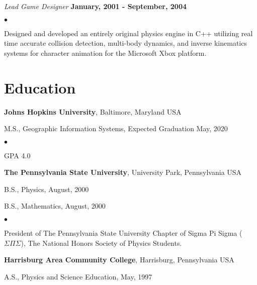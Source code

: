 \documentclass[margin,line]{res}
\newenvironment{list1}{
  \begin{list}{\ding{113}}{%
      \setlength{\itemsep}{0in}
      \setlength{\parsep}{0in} \setlength{\parskip}{0in}
      \setlength{\topsep}{0in} \setlength{\partopsep}{0in} 
      \setlength{\leftmargin}{0.17in}}}{\end{list}}
\newenvironment{list2}{
  \begin{list}{$\bullet$}{%
      \setlength{\itemsep}{0in}
      \setlength{\parsep}{0in} \setlength{\parskip}{0in}
      \setlength{\topsep}{0in} \setlength{\partopsep}{0in} 
      \setlength{\leftmargin}{0.2in}}}{\end{list}}
\begin{document}
\begin{resume}
\vspace{-.4cm}
{\em Lead Game Designer} \hfill {\bf January, 2001 - September, 2004}
\vspace*{.05in}
\begin{list2}
\item Designed and developed an entirely original physics engine in C++ utilizing real time accurate collision detection, multi-body dynamics, and inverse kinematics systems for character animation for the Microsoft Xbox platform.
\end{list2}


\section{\sc Education}
{\bf Johns Hopkins University}, Baltimore, Maryland USA\\
\vspace*{-.1in}
\begin{list1}
\item[] M.S., Geographic Information Systems, Expected Graduation May, 2020
\begin{list2}
\vspace*{.05in}
\item GPA 4.0
\end{list2}
\vspace*{.05in}
\end{list1}
{\bf The Pennsylvania State University}, University Park, Pennsylvania USA\\
\vspace*{-.1in}
\begin{list1}
\item[] B.S., Physics, August, 2000
\item[] B.S., Mathematics, August, 2000
\begin{list2}
\vspace*{.05in}
\item President of The Pennsylvania State University Chapter of Sigma Pi Sigma ($\Sigma\Pi\Sigma$), The National Honors Society of Physics Students.
\end{list2}
\vspace*{.05in}
\end{list1}

{\bf Harrisburg Area Community College}, Harrisburg, Pennsylvania USA\\
\vspace*{-.1in}
\begin{list1}
\item[] A.S., Physics and Science Education,  May, 1997
\end{list1}


\end{resume}
\end{document}
